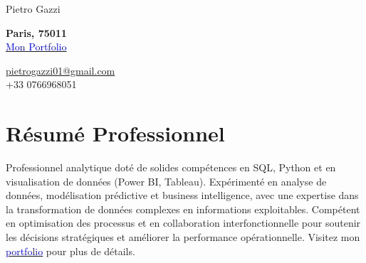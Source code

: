 \documentclass[letterpaper,10.5pt]{article}
\begin{document}

\begin{center}
    {\LARGE Pietro Gazzi}\\
        \begin{multicols}{2}
        \begin{flushleft}
            \textbf{Paris, 75011}\\
            \href{https://pietrowei.github.io/Portfolio}{\underline{\textcolor{blue}{Mon Portfolio}}}
        \end{flushleft}
        \begin{flushright}
            \href{mailto:pietrogazzi01@gmail.com}{pietrogazzi01@gmail.com}\\
            +33 0766968051
        \end{flushright}
    \end{multicols}
\end{center}

\section*{Résumé Professionnel}
Professionnel analytique doté de solides compétences en SQL, Python et en visualisation de données (Power BI, Tableau). Expérimenté en analyse de données, modélisation prédictive et business intelligence, avec une expertise dans la transformation de données complexes en informations exploitables. Compétent en optimisation des processus et en collaboration interfonctionnelle pour soutenir les décisions stratégiques et améliorer la performance opérationnelle. Visitez mon \href{https://pietrowei.github.io/Portfolio}{\underline{\textcolor{blue}{portfolio}}} pour plus de détails.

\end{document}
